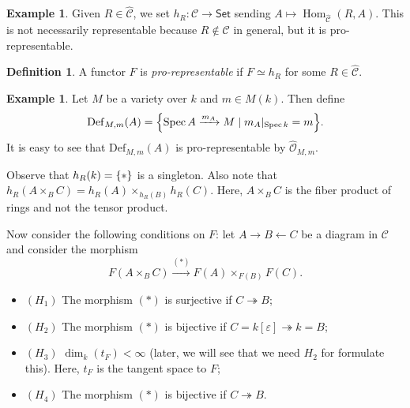 \documentclass[leqno, openany]{memoir}
\theoremstyle{definition}
\newtheorem{defn}[thm]{Definition}
\newtheorem{exm}[thm]{Example}
\theoremstyle{remark}
\theoremstyle{plain}
\theoremstyle{definition}
\theoremstyle{remark}
\newcommand{\ep}{\varepsilon}
\newcommand{\mc}[1]{\mathcal{#1}}
\newcommand{\mr}[1]{\mathrm{#1}}
\newcommand{\ms}[1]{\mathsf{#1}}
\newcommand{\wh}[1]{\widehat{#1}}
\DeclareMathOperator{\Hom}{Hom}
\DeclareMathOperator{\Spec}{Spec}
\begin{document}
\begin{exm}
    Given $R \in \wh{\mc{C}}$, we set $h_R \colon \mc{C} \to \ms{Set}$ sending $A \mapsto \Hom_{\wh{\mc{C}}}(R, A)$. This is not necessarily representable because $R \notin \mc{C}$ in general, but it is pro-representable.
\end{exm}

\begin{defn}
    A functor $F$ is \textit{pro-representable} if $F \simeq h_R$ for some $R \in \wh{\mc{C}}$.
\end{defn}

\begin{exm}
    Let $M$ be a variety over $k$ and $m \in M(k)$. Then define
    \[ \mr{Def}_{M,m}(A) = \qty{ \Spec A \xrightarrow{m_A} M \mid m_A |_{\Spec k} = m}. \]
    It is easy to see that $\mr{Def}_{M,m}(A)$ is pro-representable by $\wh{\mc{O}}_{M,m}$.
\end{exm}

Observe that $h_R(k) = \qty{*}$ is a singleton. Also note that $h_R(A \times_B C) = h_R(A) \times_{h_R(B)} h_R(C)$. Here, $A \times_B C$ is the fiber product of rings and not the tensor product.

Now consider the following conditions on $F$: let $A \to B \gets C$ be a diagram in $\mc{C}$ and consider the morphism
\[ F(A \times_B C) \xrightarrow{(*)} F(A) \times_{F(B)} F(C). \]
\begin{itemize}
    \item $(H_1)$ The morphism $(*)$ is surjective if $C \twoheadrightarrow B$;
    \item $(H_2)$ The morphism $(*)$ is bijective if $C = k[\ep] \twoheadrightarrow k = B$;
    \item $(H_3)$ $\dim_k(t_F) < \infty$ (later, we will see that we need $H_2$ for formulate this). Here, $t_F$ is the tangent space to $F$;
    \item $(H_4)$ The morphism $(*)$ is bijective if $C \twoheadrightarrow B$.
\end{itemize}
\end{document}
